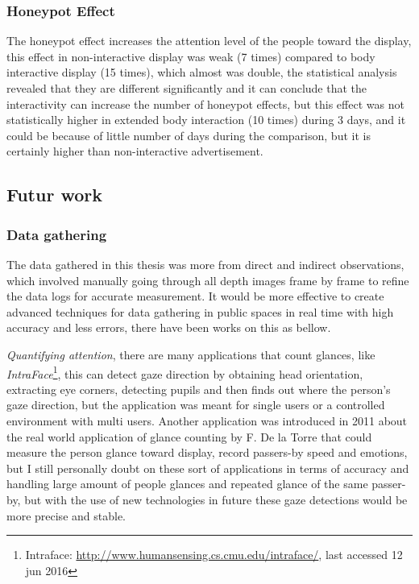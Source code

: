 \subsubsection{Honeypot Effect}
The honeypot effect increases the attention level of the people toward the display, this effect in non-interactive display was weak (7 times) compared to body interactive display (15 times), which almost was double, the statistical analysis revealed that they are different significantly and it can conclude that the interactivity can increase the number of honeypot effects, but this effect was not statistically higher in extended body interaction (10 times) during 3 days, and it could be because of little number of days during the comparison, but it is certainly higher than non-interactive advertisement. 


\subsection{Futur work}


\subsubsection{Data gathering}

The data gathered in this thesis was more from direct and indirect observations, which involved manually going through all depth images frame by frame to refine the data logs for accurate measurement. It would be more effective to create advanced techniques for data gathering in public spaces in real time with high accuracy and less errors, there have been works on this as bellow.

\emph{Quantifying attention}, there are many applications that count glances, like \emph{IntraFace}\footnote{Intraface: \url{ http://www.humansensing.cs.cmu.edu/intraface/}, last accessed 12 jun 2016}\cite{Intraface}, this can detect gaze direction by obtaining head orientation, extracting eye corners, detecting pupils and then finds out where the person’s gaze direction, but the application was meant for single users or a controlled environment with multi users.  Another application was introduced in 2011 about the real world application of glance counting by F. De la Torre \cite{glancingcount} that could measure the person glance toward display, record passers-by speed and emotions, but I still personally doubt on these sort of applications in terms of accuracy and handling large amount of people glances and repeated glance of the same passer-by, but with the use of new technologies in future these gaze detections would be more precise and stable.

